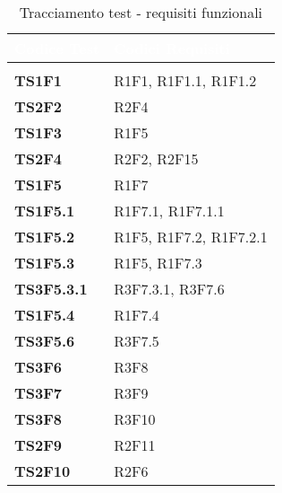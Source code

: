 \renewcommand{\arraystretch}{1.5}
\renewcommand\extrarowheight{1.5pt}
\begin{longtable}{C{2.5cm} | C{10cm} } 
		\textcolor{white}{\textbf{Codice Test}} & 
		\textcolor{white}{\textbf{Codici Requisiti}} \\
		\endfirsthead
		 \\
	    \endfoot
	    \caption{Tracciamento test - requisiti funzionali}
	    \endlastfoot
		\hline
		\textbf{TS1F1} & R1F1, R1F1.1, R1F1.2 \\
		\textbf{TS2F2} & R2F4 \\
		\textbf{TS1F3} & R1F5 \\
		\textbf{TS2F4} & R2F2, R2F15 \\
		\textbf{TS1F5} &  R1F7 \\
		\textbf{TS1F5.1} & R1F7.1, R1F7.1.1 \\
		\textbf{TS1F5.2} & R1F5, R1F7.2, R1F7.2.1 \\
		\textbf{TS1F5.3} &  R1F5, R1F7.3\\
		\textbf{TS3F5.3.1} & R3F7.3.1, R3F7.6 \\
		\textbf{TS1F5.4} & R1F7.4 \\
		\textbf{TS3F5.6} & R3F7.5 \\
		\textbf{TS3F6} & R3F8 \\
		\textbf{TS3F7} & R3F9 \\
		\textbf{TS3F8} & R3F10 \\
		\textbf{TS2F9} & R2F11 \\
		\textbf{TS2F10} & R2F6 
\end{longtable}
